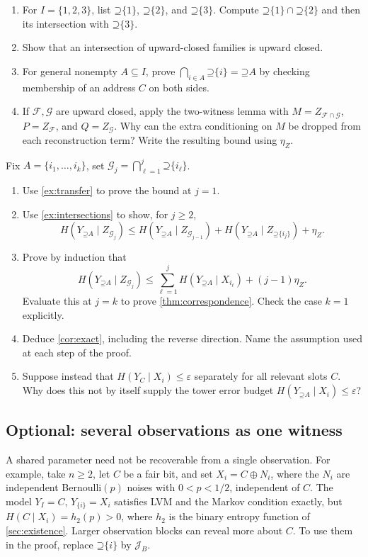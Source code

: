 \documentclass[11pt]{article}
\newcommand{\Up}{\mathord{\supseteq}}
\begin{document}
\begin{exercise}
\label{ex:intersections}\important
\begin{enumerate}
\item For $I=\{1,2,3\}$, list $\Up\{1\}$, $\Up\{2\}$, and
$\Up\{3\}$. Compute $\Up\{1\}\cap\Up\{2\}$ and then its
intersection with $\Up\{3\}$.
\item Show that an intersection of upward-closed families is upward closed.
\item For general nonempty $A\subseteq I$, prove
$\bigcap_{i\in A}\Up\{i\}=\Up A$ by checking membership of an address
$C$ on both sides.
\item If $\mathcal{F},\mathcal{G}$ are upward closed, apply the two-witness
lemma with $M=Z_{\mathcal{F}\cap\mathcal{G}}$,
$P=Z_{\mathcal{F}}$, and $Q=Z_{\mathcal{G}}$.
Why can the extra conditioning on $M$ be dropped from each reconstruction
term? Write the resulting bound using $\eta_Z$.
\end{enumerate}
\end{exercise}

\begin{exercise}
\label{ex:induction}\important
Fix $A=\{i_1,\ldots,i_k\}$, set
$\mathcal{G}_j=\bigcap_{\ell=1}^{j}\Up\{i_\ell\}$.
\begin{enumerate}
\item Use \cref{ex:transfer} to prove the bound at $j=1$.
\item Use \cref{ex:intersections} to show, for $j\ge2$,
\[
 H(Y_{\Up A}\mid Z_{\mathcal{G}_j})\le
 H(Y_{\Up A}\mid Z_{\mathcal{G}_{j-1}})+H(Y_{\Up A}\mid Z_{\Up\{i_j\}})+\eta_Z.
\]
\item Prove by induction that
\[
 H(Y_{\Up A}\mid Z_{\mathcal{G}_j})\le
 \sum_{\ell=1}^{j}H(Y_{\Up A}\mid X_{i_\ell})+(j-1)\eta_Z.
\]
Evaluate this at $j=k$ to prove \cref{thm:correspondence}. Check the
case $k=1$ explicitly.
\item Deduce \cref{cor:exact}, including the reverse direction. Name the
assumption used at each step of the proof.
\item Suppose instead that $H(Y_C\mid X_i)\le\varepsilon$ separately for
all relevant slots $C$. Why does this not by itself supply the tower error
budget $H(Y_{\Up A}\mid X_i)\le\varepsilon$?
\end{enumerate}
\end{exercise}

\subsection{Optional: several observations as one witness}
\label{sec:blocks}
A shared parameter need not be recoverable from a single observation. For
example, take $n\ge2$, let $C$ be a fair bit, and set
$X_i=C\mathbin{\oplus}N_i$, where the
$N_i$ are independent Bernoulli$(p)$ noises with $0<p<1/2$, independent of
$C$. The model $Y_I=C$, $Y_{\{i\}}=X_i$ satisfies LVM and the
Markov condition exactly, but $H(C\mid X_i)=h_2(p)>0$, where
$h_2$ is the binary entropy function of \cref{sec:existence}.
Larger observation blocks can reveal more about $C$. To use them in the proof,
replace $\Up\{i\}$ by $\mathcal{J}_B$.
\end{document}
